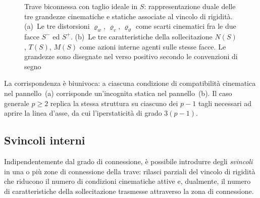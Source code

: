 \begin{oss}
\begin{figure}[!htbp]
%
		\caption{Trave biconnessa con taglio ideale in $S$:
			rappresentazione duale delle tre grandezze cinematiche
			e statiche associate al vincolo di rigidità.
			(a)~Le tre distorsioni $\varrho_w$, $\varrho_v$,
			$\varrho_\vartheta$ come scarti cinematici fra le
			due facce $S^-$ ed $S^+$.
			(b)~Le tre caratteristiche della sollecitazione
			$N(S)$, $T(S)$, $M(S)$ come azioni interne agenti
			sulle stesse facce. Le grandezze sono disegnate nel
			verso positivo secondo le convenzioni di segno}
		\label{fig:biconnessa_dualita}
	\end{figure}
	
	La corrispondenza è biunivoca: a ciascuna condizione
	di compatibilità cinematica nel pannello~(a)
	corrisponde un'incognita statica nel pannello~(b).
	Il caso generale $p \geq 2$ replica la stessa
	struttura su ciascuno dei $p-1$ tagli necessari ad
	aprire la linea d'asse, da cui l'iperstaticità di
	grado $3(p-1)$.
\end{oss}



\subsection{Svincoli interni}
\label{sec:svincoli_interni}

Indipendentemente dal grado di connessione, è possibile
introdurre degli \emph{svincoli} in una o più zone di
connessione della trave: rilasci parziali del vincolo
di rigidità che riducono il numero di condizioni
cinematiche attive e, dualmente, il numero di
caratteristiche della sollecitazione trasmesse
attraverso la zona di connessione.

